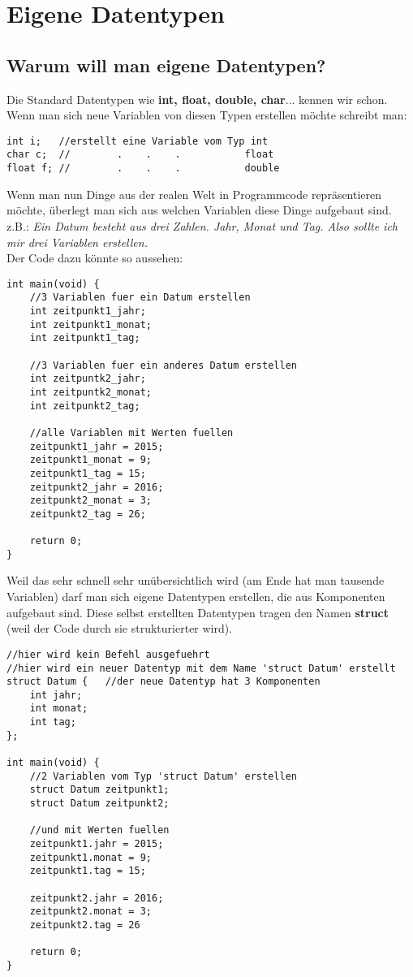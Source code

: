\documentclass[c_worksheet.tex]{subfiles}
\begin{document}
  
\chapter{Eigene Datentypen}

\section{Warum will man eigene Datentypen?}

Die Standard Datentypen wie \textbf{int, float, double, char}... kennen wir schon. Wenn man sich neue Variablen von diesen Typen erstellen möchte schreibt man:
\begin{lstlisting}
int i;   //erstellt eine Variable vom Typ int
char c;  //        .    .    .           float
float f; //        .    .    .           double
\end{lstlisting}

Wenn man nun Dinge aus der realen Welt in Programmcode repräsentieren möchte, überlegt man sich aus welchen Variablen diese Dinge aufgebaut sind.\\
z.B.: \textit{Ein Datum besteht aus drei Zahlen. Jahr, Monat und Tag. Also sollte ich mir drei Variablen erstellen.} \\

Der Code dazu könnte so aussehen:
\begin{lstlisting}
int main(void) {
    //3 Variablen fuer ein Datum erstellen
    int zeitpunkt1_jahr;
    int zeitpunkt1_monat;
    int zeitpunkt1_tag;

    //3 Variablen fuer ein anderes Datum erstellen
    int zeitpuntk2_jahr;
    int zeitpuntk2_monat;
    int zeitpunkt2_tag;

    //alle Variablen mit Werten fuellen
    zeitpunkt1_jahr = 2015;
    zeitpunkt1_monat = 9;
    zeitpunkt1_tag = 15;
    zeitpunkt2_jahr = 2016;
    zeitpunkt2_monat = 3;
    zeitpunkt2_tag = 26;

    return 0;
}
\end{lstlisting}

Weil das sehr schnell sehr unübersichtlich wird (am Ende hat man tausende Variablen) darf man sich eigene Datentypen erstellen, die aus Komponenten aufgebaut sind.
Diese selbst erstellten Datentypen tragen den Namen \textbf{struct} (weil der Code durch sie strukturierter wird).

\begin{lstlisting}
//hier wird kein Befehl ausgefuehrt
//hier wird ein neuer Datentyp mit dem Name 'struct Datum' erstellt
struct Datum {   //der neue Datentyp hat 3 Komponenten
    int jahr;
    int monat;
    int tag;
};

int main(void) {
    //2 Variablen vom Typ 'struct Datum' erstellen
    struct Datum zeitpunkt1;
    struct Datum zeitpunkt2;

    //und mit Werten fuellen
    zeitpunkt1.jahr = 2015;
    zeitpunkt1.monat = 9;
    zeitpunkt1.tag = 15;

    zeitpunkt2.jahr = 2016;
    zeitpunkt2.monat = 3;
    zeitpunkt2.tag = 26

    return 0;
}
\end{lstlisting}
\end{document}
